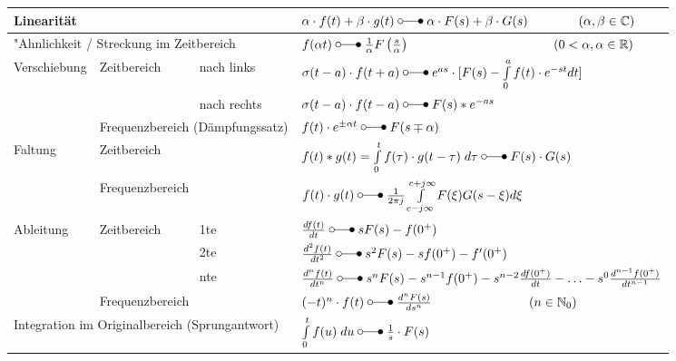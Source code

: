 		
		
	  \renewcommand{\arraystretch}{2}
		\begin{tabular}{|p{2.5cm}|p{3cm}|p{2.5cm}p{10cm}|}
			\hline
				\multicolumn{3}{|l}{Linearität}   &  $\alpha\cdot f(t) + \beta\cdot g(t) \; \laplace \; \alpha\cdot F(s) + \beta\cdot G(s) \qquad\qquad (\alpha, \beta \in\mathbb{C})$ \\ 
			\hline
				\multicolumn{3}{|l}{"Ahnlichkeit / Streckung im Zeitbereich}   &  $f(\alpha t) \; \laplace \; \frac{1}{\alpha}F \left (\frac{s}{\alpha} \right ) \hspace{4cm} (0 <\alpha, \alpha \in\mathbb{R})$ \\
			\hline
			\hline
				\multirow{3}{*}{Verschiebung} & \multirow{2}{*}{Zeitbereich} & nach links &  $\sigma(t-a) \cdot f(t + a) \; \laplace \; e^{as} \cdot [F(s) - \int\limits_0^{a} f(t) \cdot e^{-st} dt]$	 \\ \cline{3-4} 
				&  & nach rechts  & $\sigma(t-a) \cdot f(t - a) \; \laplace \; F(s)*e^{-as}$ \\ \cline{2-4}
				& \multicolumn{2}{l}{Frequenzbereich (Dämpfungssatz)} & $f(t) \cdot e^{\pm\alpha t} \; \laplace \; F(s\mp\alpha)$\\ 
			\hline
			\hline
				\multirow{2}{*}{Faltung} & \multicolumn{2}{l}{Zeitbereich} & $f(t) \ast g(t) = \int\limits_{0}^{t} f(\tau) \cdot g(t-\tau) \; d\tau \; \laplace \; F(s)
				\cdot G(s)$ \\ \cline{2-4} 
				& \multicolumn{2}{l}{Frequenzbereich} &  $f(t) \cdot g(t) \; \laplace \; \frac{1}{2\pi j}\int\limits_{c-j\infty}^{c+j\infty}
				F(\xi) G(s-\xi)d\xi$\\ 
			\hline
			\hline
				\multirow{4}{*}{Ableitung} & \multirow{3}{*}{Zeitbereich} & 1te & 	$\frac{d f(t)}{d t} \; \laplace \; sF(s)-f(0^+)$ \\ \cline{3-4}
				&  & 2te  &  $\frac{d^2 f(t)}{d t^2} \; \laplace \; s^2F(s)		-sf(0^+) -f'(0^+)$\\ \cline{3-4}
				&  & nte  &  $\frac{d^n f(t)}{d t^n} \; \laplace \; s^nF(s)
				-s^{n-1}f(0^+)-s^{n-2}\frac{d f(0^+)}{d t}-\ldots
				-s^0\frac{d^{n-1} f(0^+)}{d t^{n-1}}$\\ \cline{2-4} 
				& \multicolumn{2}{l}{Frequenzbereich} & $(-t)^n \cdot f(t) \; \laplace \;  \frac{d^n F(s)}{d s^n} \qquad \hspace{2cm} (n \in \mathbb{N}_0)$\\
			\hline
			\hline
				\multicolumn{3}{|l}{Integration im Originalbereich (Sprungantwort)}   &  $\int\limits_0^t f(u) \; du \; \laplace \; \frac{1}{s}\cdot F(s)$ \\

\end{tabular}
